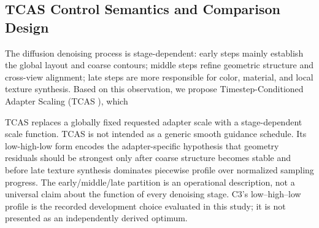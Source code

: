 \documentclass[times,twocolumn,final]{elsarticle}
\providecommand{\DIFadd}[1]{{\protect\color{blue} \sf #1}} %
\providecommand{\DIFdel}[1]{{\protect\color{red} \scriptsize #1}} %
\providecommand{\DIFaddbegin}{} %
\providecommand{\DIFaddend}{} %
\providecommand{\DIFdelbegin}{} %
\providecommand{\DIFdelend}{} %
\begin{document}
\DIFdelbegin %
\DIFdelend \DIFaddbegin \subsection{TCAS Control Semantics and Comparison Design}
\DIFaddend \label{subsec:tcas}
\DIFdelbegin %

\DIFdel{The diffusion denoising process is stage-dependent: early steps mainly establish the global layout and coarse contours; middle steps refine geometric structure and cross-view alignment; late steps are more responsible for color, material, and local texture synthesis.
Based on this observation, we propose Timestep-Conditioned Adapter Scaling (TCAS ), which }\DIFdelend \DIFaddbegin

\DIFadd{TCAS }\DIFaddend replaces a globally fixed \DIFaddbegin \DIFadd{requested }\DIFaddend adapter scale with a \DIFdelbegin \DIFdel{stage-dependent scale function. TCAS is not intended as a generic smooth guidance schedule. Its low-high-low form encodes the adapter-specific hypothesis that geometry residuals should be strongest only after coarse structure becomes stable and before late texture synthesis dominates}\DIFdelend \DIFaddbegin \DIFadd{piecewise profile over normalized sampling progress. The early/middle/late partition is an operational description, not a universal claim about the function of every denoising stage. C3's low--high--low profile is the recorded development choice evaluated in this study; it is not presented as an independently derived optimum}\DIFaddend .
\end{document}
